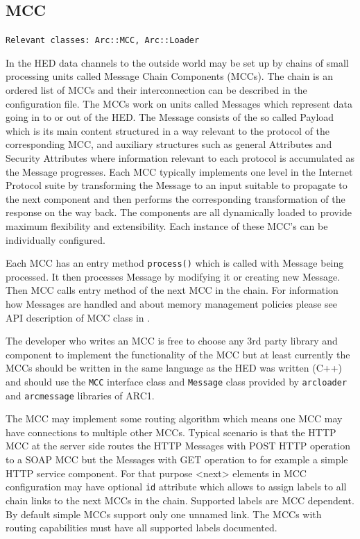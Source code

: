 \documentclass{book}
\begin{document}
\subsection{MCC}

\texttt{Relevant classes: Arc::MCC, Arc::Loader}

In the HED data channels to the outside world may be set up by chains of small processing units called Message Chain Components (MCCs). The chain is an ordered list of MCCs and their interconnection can be described in the configuration file. The MCCs work on units called Messages which represent data going in to or out of the HED. The Message consists of the so called Payload which is its main content structured in a way relevant to the protocol of the corresponding MCC, and auxiliary structures such as general Attributes and Security Attributes where information relevant to each protocol is accumulated as the Message progresses. Each MCC typically implements one level in the Internet Protocol suite by transforming the Message to an input suitable to propagate to the next component and then performs the corresponding transformation of the response on the way back. The components are all dynamically loaded to provide maximum flexibility and extensibility. Each instance of these MCC's can be individually configured.

Each MCC has an entry method \texttt{process()} which is called with Message being processed. It then processes Message by modifying it or creating new Message. Then MCC calls entry method of the next MCC in the chain. For information how Messages are handled and about memory management policies please see API description of MCC class in \cite{hed-api}.

The developer who writes an MCC is free to choose any 3rd party library and component to implement the functionality of the MCC but at least currently the MCCs should be written in the same language as the HED was written (C++) and should use the \texttt{MCC} interface class and \texttt{Message} class provided by \texttt{arcloader} and \texttt{arcmessage} libraries of ARC1.

The MCC may implement some routing algorithm which means one MCC may have connections to multiple other MCCs. Typical scenario is that the HTTP MCC at the server side routes the HTTP Messages with POST HTTP operation to a SOAP MCC but the Messages with GET operation to for example a simple HTTP service component. For that purpose <next> elements in MCC configuration may have optional \texttt{id} attribute which allows to assign labels to all chain links to the next MCCs in the chain. Supported labels are MCC dependent. By default simple MCCs support only one unnamed link. The MCCs with routing capabilities must have all supported labels documented.
\end{document}
